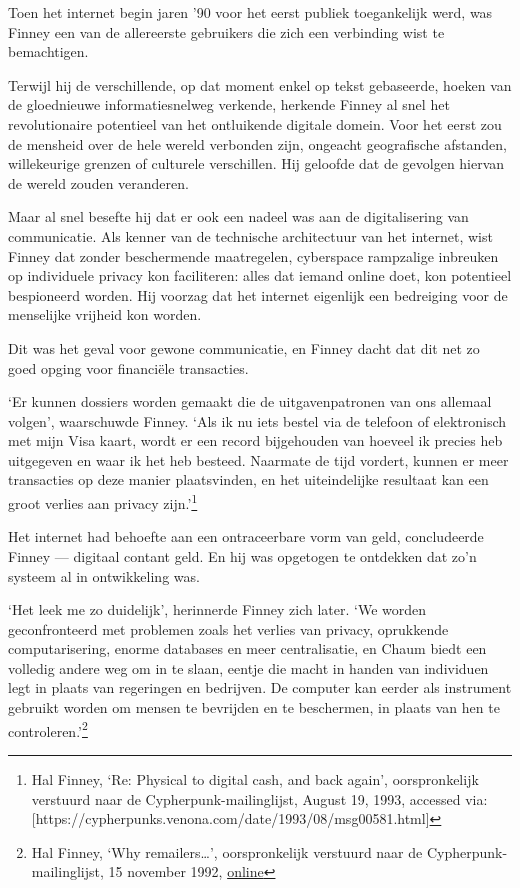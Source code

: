 \documentclass[smalldemyvopaper,11pt,twoside,onecolumn,openright,extrafontsizes,hidelinks]{memoir}
\begin{document}
Toen het internet begin jaren '90 voor het eerst publiek toegankelijk
werd, was Finney een van de allereerste gebruikers die zich een
verbinding wist te bemachtigen.

Terwijl hij de verschillende, op dat moment enkel op tekst gebaseerde,
hoeken van de gloednieuwe informatiesnelweg verkende, herkende Finney al
snel het revolutionaire potentieel van het ontluikende digitale domein.
Voor het eerst zou de mensheid over de hele wereld verbonden zijn,
ongeacht geografische afstanden, willekeurige grenzen of culturele
verschillen. Hij geloofde dat de gevolgen hiervan de wereld zouden
veranderen.

Maar al snel besefte hij dat er ook een nadeel was aan de digitalisering
van communicatie. Als kenner van de technische architectuur van het
internet, wist Finney dat zonder beschermende maatregelen, cyberspace
rampzalige inbreuken op individuele privacy kon faciliteren: alles dat
iemand online doet, kon potentieel bespioneerd worden. Hij voorzag dat
het internet eigenlijk een bedreiging voor de menselijke vrijheid kon
worden.

Dit was het geval voor gewone communicatie, en Finney dacht dat dit net
zo goed opging voor financiële transacties.

`Er kunnen dossiers worden gemaakt die de uitgavenpatronen van ons
allemaal volgen', waarschuwde Finney. `Als ik nu iets bestel via de
telefoon of elektronisch met mijn Visa kaart, wordt er een record
bijgehouden van hoeveel ik precies heb uitgegeven en waar ik het heb
besteed. Naarmate de tijd vordert, kunnen er meer transacties op deze
manier plaatsvinden, en het uiteindelijke resultaat kan een groot
verlies aan privacy zijn.'\footnote{Hal Finney, `Re: Physical to digital
  cash, and back again', oorspronkelijk verstuurd naar de
  Cypherpunk-mailinglijst, August 19, 1993, accessed via:
  {[}https://cypherpunks.venona.com/date/1993/08/msg00581.html{]}}

Het internet had behoefte aan een ontraceerbare vorm van geld,
concludeerde Finney --- digitaal contant geld. En hij was opgetogen te
ontdekken dat zo'n systeem al in ontwikkeling was.

`Het leek me zo duidelijk', herinnerde Finney zich later. `We worden
geconfronteerd met problemen zoals het verlies van privacy, oprukkende
computarisering, enorme databases en meer centralisatie, en Chaum biedt
een volledig andere weg om in te slaan, eentje die macht in handen van
individuen legt in plaats van regeringen en bedrijven. De computer kan
eerder als instrument gebruikt worden om mensen te bevrijden en te
beschermen, in plaats van hen te controleren.'\footnote{Hal Finney, `Why
  remailers\ldots{}', oorspronkelijk verstuurd naar de
  Cypherpunk-mailinglijst, 15 november 1992,
  \href{https://cypherpunks.venona.com/date/1993/08/msg00581.html}{online}}
\end{document}
